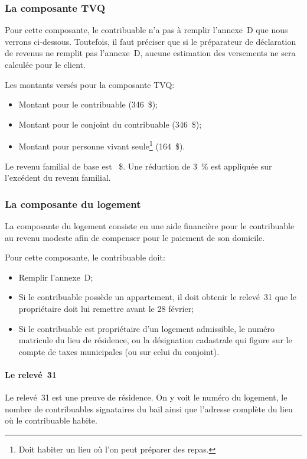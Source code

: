 \subsubsection{La composante TVQ}
Pour cette composante, le contribuable n'a pas à remplir l'annexe~D que nous verrons ci-dessous. Toutefois, il faut préciser que si le préparateur de déclaration de revenus ne remplit pas l'annexe~D, aucune estimation des versements ne sera calculée pour le client.

Les montants versés pour la composante TVQ:
\begin{itemize}
	\item Montant pour le contribuable (346~\$);
	\item Montant pour le conjoint du contribuable (346~\$);
	\item Montant pour personne vivant seule\footnote{Doit habiter un lieu où l'on peut préparer des repas.} (164~\$).
\end{itemize}

Le revenu familial de base est ~\$.
Une réduction de 3~\% est appliquée sur l'excédent du revenu familial.


\subsubsection{La composante du logement}
La composante du logement consiste en une aide financière pour le contribuable au revenu modeste afin de compenser pour le paiement de son domicile.

Pour cette composante, le contribuable doit: 
\begin{itemize}
	\item Remplir l'annexe~D;
	\item Si le contribuable possède un appartement, il doit obtenir le relevé~31 que le propriétaire doit lui remettre avant le 28 février;
	\item Si le contribuable est propriétaire d'un logement admissible, le numéro matricule du lieu de résidence, ou la désignation cadastrale qui figure sur le compte de taxes municipales (ou sur celui du conjoint).
\end{itemize}

\paragraph{Le relevé~31}
Le relevé~31 est une preuve de résidence. On y voit le numéro du logement, le nombre de contribuables signataires du bail ainsi que l'adresse complète du lieu où le contribuable habite. 

